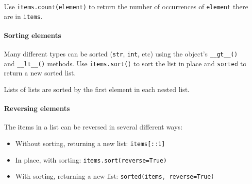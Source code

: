 Use \texttt{items.count(element)} to return the number of occurrences of \texttt{element} there are in \texttt{items}.

\paragraph{Sorting elements}\label{par:sorting_elements}

Many different types can be sorted (\texttt{str}, \texttt{int}, etc) using the object's \texttt{__gt__()} and \texttt{__lt__()} methods.
Use \texttt{items.sort()} to sort the list in place and \texttt{sorted} to return a new sorted list.

\begin{note}
    Lists of lists are sorted by the first element in each nested list.
\end{note}

\paragraph{Reversing elements}\label{par:reversing_elements}

The items in a list can be reversed in several different ways:

\begin{itemize}
    \item Without sorting, returning a new list: \texttt{items[::1]}
    \item In place, with sorting: \texttt{items.sort(reverse=True)}
    \item With sorting, returning a new list: \texttt{sorted(items, reverse=True)}
\end{itemize}

